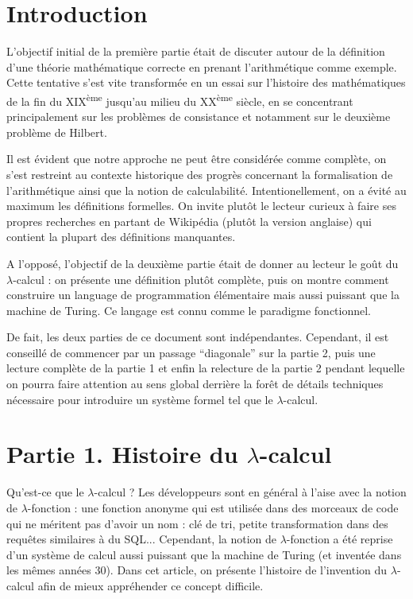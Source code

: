 \documentclass[12pt, a4paper]{article}
\begin{document}
	
\section*{Introduction}
L'objectif initial de la première partie était de discuter autour de la définition d'une théorie mathématique correcte en prenant l'arithmétique comme exemple. Cette tentative s'est vite transformée en un essai sur l'histoire des mathématiques de la fin du XIX\textsuperscript{ème} jusqu'au milieu du XX\textsuperscript{ème} siècle, en se concentrant principalement sur les problèmes de consistance et notamment sur le deuxième problème de Hilbert.

Il est évident que notre approche ne peut être considérée comme complète, on s'est restreint au contexte historique des progrès concernant la formalisation de l'arithmétique ainsi que la notion de calculabilité. Intentionellement, on a évité au maximum les définitions formelles. On invite plutôt le lecteur curieux à faire ses propres recherches en partant de Wikipédia (plutôt la version anglaise) qui contient la plupart des définitions manquantes.

A l'opposé, l'objectif de la deuxième partie était de donner au lecteur le goût du $\lambda$-calcul : on présente une définition plutôt complète, puis on montre comment construire un language de programmation élémentaire mais aussi puissant que la machine de Turing. Ce langage est connu comme le paradigme fonctionnel.

De fait, les deux parties de ce document sont indépendantes. Cependant, il est conseillé de commencer par un passage ``diagonale'' sur la partie 2, puis une lecture complète de la partie 1 et enfin la relecture de la partie 2 pendant lequelle on pourra faire attention au sens global derrière la forêt de détails techniques nécessaire pour introduire un système formel tel que le $\lambda$-calcul.
	
\section*{Partie 1. Histoire du $\lambda$-calcul}

Qu'est-ce que le $\lambda$-calcul ?
Les développeurs sont en général à l'aise avec la notion de $\lambda$-fonction : une fonction anonyme qui est utilisée dans des morceaux de code qui ne méritent pas d'avoir un nom : clé de tri, petite transformation dans des requêtes similaires à du SQL...
Cependant, la notion de $\lambda$-fonction a été reprise d'un système de calcul aussi puissant que la machine de Turing (et inventée dans les mêmes années 30).
Dans cet article, on présente l'histoire de l'invention du $\lambda$-calcul afin de mieux appréhender ce concept difficile.
\end{document}
